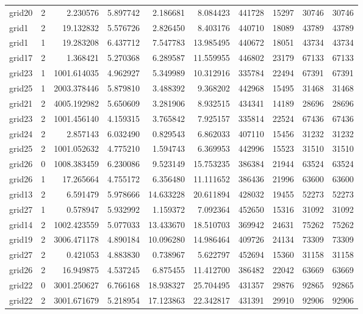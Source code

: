 \begin{longtable}{|l|r|r|r|r|r|r|r|r|r|}
grid20 & 2 & 2.230576 & 5.897742 & 2.186681 & 8.084423 & 441728 & 15297 & 30746 & 30746 \\
grid1 & 2 & 19.132832 & 5.576726 & 2.826450 & 8.403176 & 440710 & 18089 & 43789 & 43789 \\
grid1 & 1 & 19.283208 & 6.437712 & 7.547783 & 13.985495 & 440672 & 18051 & 43734 & 43734 \\
grid17 & 2 & 1.368421 & 5.270368 & 6.289587 & 11.559955 & 446802 & 23179 & 67133 & 67133 \\
grid23 & 1 & 1001.614035 & 4.962927 & 5.349989 & 10.312916 & 335784 & 22494 & 67391 & 67391 \\
grid25 & 1 & 2003.378446 & 5.879810 & 3.488392 & 9.368202 & 442968 & 15495 & 31468 & 31468 \\
grid21 & 2 & 4005.192982 & 5.650609 & 3.281906 & 8.932515 & 434341 & 14189 & 28696 & 28696 \\
grid23 & 2 & 1001.456140 & 4.159315 & 3.765842 & 7.925157 & 335814 & 22524 & 67436 & 67436 \\
grid24 & 2 & 2.857143 & 6.032490 & 0.829543 & 6.862033 & 407110 & 15456 & 31232 & 31232 \\
grid25 & 2 & 1001.052632 & 4.775210 & 1.594743 & 6.369953 & 442996 & 15523 & 31510 & 31510 \\
grid26 & 0 & 1008.383459 & 6.230086 & 9.523149 & 15.753235 & 386384 & 21944 & 63524 & 63524 \\
grid26 & 1 & 17.265664 & 4.755172 & 6.356480 & 11.111652 & 386436 & 21996 & 63600 & 63600 \\
grid13 & 2 & 6.591479 & 5.978666 & 14.633228 & 20.611894 & 428032 & 19455 & 52273 & 52273 \\
grid27 & 1 & 0.578947 & 5.932992 & 1.159372 & 7.092364 & 452650 & 15316 & 31092 & 31092 \\
grid14 & 2 & 1002.423559 & 5.077033 & 13.433670 & 18.510703 & 369942 & 24631 & 75262 & 75262 \\
grid19 & 2 & 3006.471178 & 4.890184 & 10.096280 & 14.986464 & 409726 & 24134 & 73309 & 73309 \\
grid27 & 2 & 0.421053 & 4.883830 & 0.738967 & 5.622797 & 452694 & 15360 & 31158 & 31158 \\
grid26 & 2 & 16.949875 & 4.537245 & 6.875455 & 11.412700 & 386482 & 22042 & 63669 & 63669 \\
grid22 & 0 & 3001.250627 & 6.766168 & 18.938327 & 25.704495 & 431357 & 29876 & 92865 & 92865 \\
grid22 & 2 & 3001.671679 & 5.218954 & 17.123863 & 22.342817 & 431391 & 29910 & 92906 & 92906 \\

\end{longtable}
